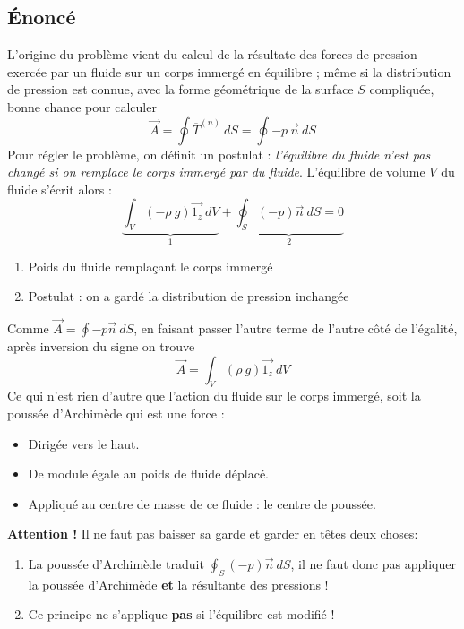     \subsection{Énoncé}
	L'origine du problème vient du calcul de la résultate des forces de pression exercée par
	un fluide sur un corps immergé en équilibre ; même si la distribution de pression est 
	connue, avec la forme géométrique de la surface $S$ compliquée, bonne chance pour 
	calculer 
	\begin{equation}
	\vec{A} = \oint \overline{T}^{(n)}\ dS = \oint -p\ \vec{n}\ dS
	\end{equation}
	Pour régler le problème, on définit un postulat : \textit{l'équilibre du fluide n'est 
	pas changé si on remplace le corps immergé par du fluide}. L'équilibre de volume $V$ 
	du fluide s'écrit alors :
	\begin{equation}
	\underbrace{\int_V (-\rho\ g)\vec{1_z}\ dV}_{1} + \underbrace{\oint_S (-p)\vec{n}\ dS
	 =0}_{2}
	\end{equation}
	\begin{enumerate}
	\item Poids du fluide remplaçant le corps immergé
	\item Postulat : on a gardé la distribution de pression inchangée
	\end{enumerate}
	Comme $\vec A = \oint - p\vec{n}\ dS$, en faisant passer l'autre terme de l'autre côté
	de l'égalité, après inversion du signe on trouve 
	\begin{equation}
	\vec{A} = \int_V (\rho\ g)\vec{1_z}\ dV
	\end{equation}
	Ce qui n'est rien d'autre que l'action du fluide sur le corps immergé, soit la poussée
	d'Archimède qui est une force :
	\begin{itemize}
	\item Dirigée vers le  haut.
	\item De module égale au poids de fluide déplacé.
	\item Appliqué au centre de masse de ce fluide : le centre de poussée.
	\end{itemize}
	
	\textbf{Attention !} Il ne faut pas baisser sa garde et garder en têtes deux choses:
	\begin{enumerate}
	\item La poussée d'Archimède traduit $\oint_S (-p)\vec{n}\ dS$, il ne faut donc pas 
	appliquer la poussée d'Archimède \textbf{et} la résultante des pressions !
	\item Ce principe ne s'applique \textbf{pas} si l'équilibre est modifié !
	\end{enumerate}    
    

